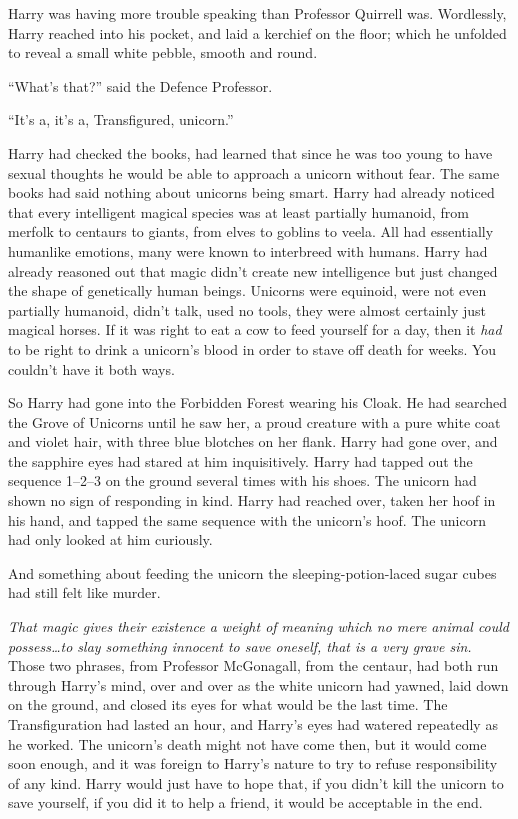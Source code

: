 Harry was having more trouble speaking than Professor Quirrell was. Wordlessly, Harry reached into his pocket, and laid a kerchief on the floor; which he unfolded to reveal a small white pebble, smooth and round.

“What’s that?” said the Defence Professor.

“It’s a, it’s a, Transfigured, unicorn.”

Harry had checked the books, had learned that since he was too young to have sexual thoughts he would be able to approach a unicorn without fear. The same books had said nothing about unicorns being smart. Harry had already noticed that every intelligent magical species was at least partially humanoid, from merfolk to centaurs to giants, from elves to goblins to veela. All had essentially humanlike emotions, many were known to interbreed with humans. Harry had already reasoned out that magic didn’t create new intelligence but just changed the shape of genetically human beings. Unicorns were equinoid, were not even partially humanoid, didn’t talk, used no tools, they were almost certainly just magical horses. If it was right to eat a cow to feed yourself for a day, then it \emph{had} to be right to drink a unicorn’s blood in order to stave off death for weeks. You couldn’t have it both ways.

So Harry had gone into the Forbidden Forest wearing his Cloak. He had searched the Grove of Unicorns until he saw her, a proud creature with a pure white coat and violet hair, with three blue blotches on her flank. Harry had gone over, and the sapphire eyes had stared at him inquisitively. Harry had tapped out the sequence 1–2–3 on the ground several times with his shoes. The unicorn had shown no sign of responding in kind. Harry had reached over, taken her hoof in his hand, and tapped the same sequence with the unicorn’s hoof. The unicorn had only looked at him curiously.

And something about feeding the unicorn the sleeping-potion-laced sugar cubes had still felt like murder.

\emph{That magic gives their existence a weight of meaning which no mere animal could possess…to slay something innocent to save oneself, that is a very grave sin.} Those two phrases, from Professor McGonagall, from the centaur, had both run through Harry’s mind, over and over as the white unicorn had yawned, laid down on the ground, and closed its eyes for what would be the last time. The Transfiguration had lasted an hour, and Harry’s eyes had watered repeatedly as he worked. The unicorn’s death might not have come then, but it would come soon enough, and it was foreign to Harry’s nature to try to refuse responsibility of any kind. Harry would just have to hope that, if you didn’t kill the unicorn to save yourself, if you did it to help a friend, it would be acceptable in the end.

